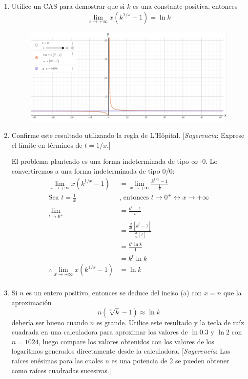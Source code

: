\documentclass[12pt]{article}
\begin{document}
\begin{enumerate}[label=\alph*)]
\item Utilice un CAS para demostrar que si $k$ es una constante positiva, entonces
  \[
  \lim_{x \to +\infty} x(k^{1/x}-1)=\ln{k}
  \]
  
\begin{figure}[H]
\centering
\includegraphics[width=1\textwidth]{../img/img_Lista3/cas65.png}
\end{figure}
  
\item Confirme este resultado utilizando la regla de L'Hôpital. [\textit{Sugerencia}: Exprese el límite en términos de $t = 1/x$.]

  El problema planteado es una forma indeterminada de tipo $\infty \cdot 0$. Lo convertiremos a una forma indeterminada de tipo 0/0:
  \begin{align*}
    \lim_{x \to +\infty} x(k^{1/x}-1)
    &= \lim_{x \to +\infty} \frac{k^{1/x}-1}{\frac{1}{x}} \\
    \text{Sea } t=\frac{1}{x}
    & \text{, entonces } t\rightarrow 0^+ \leftrightarrow x\rightarrow +\infty \\
    \lim_{t \to 0^+}
    &= \frac{k^t-1}{t} \\
    &= \frac{\frac{d}{dt}[k^t-1]}{\frac{d}{dt}[t]} \\
    &= \frac{k^t\ln{k}}{1} \\
    &= k^t\ln{k} \\
    \therefore
    \lim_{x \to +\infty} x(k^{1/x}-1)
    &= \ln{k} \\
  \end{align*}
  
\item Si $n$ es un entero positivo, entonces se deduce del inciso (a) con $x = n$ que la aproximación
  \[
  n(\sqrt[n]{k}-1)\approx \ln{k}
\]
debería ser bueno cuando $n$ es grande. Utilice este resultado y la tecla de raíz cuadrada en una calculadora para aproximar los valores de $\ln{0.3}$ y $\ln{2}$ con $n = 1024$, luego compare los valores obtenidos con los valores de los logaritmos generados directamente desde la calculadora. [\textit{Sugerencia}: Las raíces enésimas para las cuales $n$ es una potencia de 2 se pueden obtener como raíces cuadradas sucesivas.]


\end{enumerate}
\end{document}
